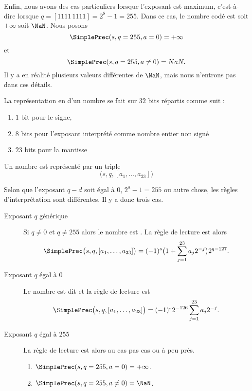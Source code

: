 Enfin, nous avons des cas particuliers lorsque l'exposant est maximum, c'est-à-dire lorsque \( q=[1111\,1111]=2^8-1=255\). Dans ce cas, le nombre codé est soit \( +\infty\) soit \( \NaN\). Nous posons
\begin{equation}
	\SimplePrec(s,q=255,a=0)=+\infty
\end{equation}
et
\begin{equation}
	\SimplePrec(s,q=255,a\neq 0)=NaN.
\end{equation}
Il y a en réalité plusieurs valeurs différentes de \( \NaN\), mais nous n'entrons pas dans ces détails\cite{ooPOZNooQlGiUN}.

\begin{definition}        \label{DEFooEIOZooYLDVjs}
	La représentation en  d'un nombre se fait sur \( 32\) bits répartis comme suit :
	\begin{enumerate}
		\item
		      \( 1\) bit pour le signe,
		\item
		      \( 8\) bits pour l'exposant interprété comme nombre entier non signé
		\item
		      \( 23\) bits pour la mantisse
	\end{enumerate}

	Un nombre est représenté par un triple
	\begin{equation}
		\big( s,q,[a_1,\ldots, a_{23}] \big)
	\end{equation}

	Selon que l'exposant \( q-d\) soit égal à \( 0\), \( 2^8-1=255\) ou autre chose, les règles d'interprétation sont différentes. Il y a donc trois cas.
	\begin{description}
		\item[Exposant \( q\) générique\cite{ooMPTNooYbSwJS}]
		      Si \( q\neq 0\) et \( q\neq 255\) alors le nombre est . La règle de lecture est alors
		      \begin{equation}        \label{EQooEFEKooIrUaKj}
			      \SimplePrec\big( s,q,[a_1,\ldots, a_{23}] \big)=(-1)^s\big( 1+\sum_{j=1}^{23}a_j2^{-j} \big)2^{q-127}.
		      \end{equation}
		\item[Exposant \( q\) égal à \( 0\)] Le nombre est dit  et la règle de lecture est
		      \begin{equation}        \label{EQooRTBFooIplydi}
			      \SimplePrec\big( s,q,[a_1,\ldots, a_{23}] \big)=(-1)^s2^{-126}\sum_{j=1}^{23}a_j2^{-j}.
		      \end{equation}
		\item[Exposant \( q\) égal à \( 255\)]
		      La règle de lecture est alors au cas pas cas ou à peu près.
		      \begin{enumerate}
			      \item
			            \( \SimplePrec(s,q=255,a=0)=+\infty\).
			      \item
			            \( \SimplePrec(s,q=255,a\neq 0)=\NaN\).
		      \end{enumerate}
	\end{description}
\end{definition}

